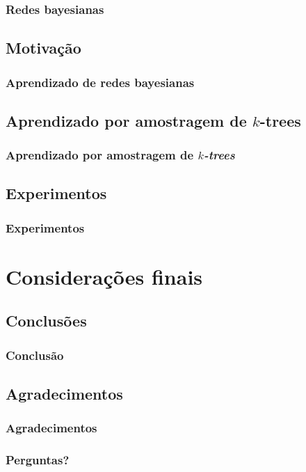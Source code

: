 \documentclass{beamer}
\begin{document}
  \begin{frame}
    \frametitle{Redes bayesianas}

  \end{frame}

  \subsection{Motivação}

  \begin{frame}
    \frametitle{Aprendizado de redes bayesianas}

  \end{frame}

  \subsection{Aprendizado por amostragem de $k$-trees}

  \begin{frame}
    \frametitle{Aprendizado por amostragem de \emph{$k$-trees}}

  \end{frame}

  \subsection{Experimentos}

  \begin{frame}
    \frametitle{Experimentos}

  \end{frame}

  \section{Considerações finais}

  \subsection{Conclusões}

  \begin{frame}
    \frametitle{Conclusão}

  \end{frame}

  \subsection{Agradecimentos}

  \begin{frame}
    \frametitle{Agradecimentos}

  \end{frame}

  \begin{frame}
    \frametitle{Perguntas?}

  \end{frame}
\end{document}
